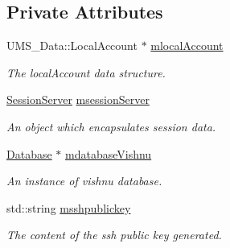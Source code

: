 \subsection*{Private Attributes}
\begin{DoxyCompactItemize}
\item 
\hypertarget{classLocalAccountServer_abe6fd379011deb69279d5a6b137b8511}{
UMS\_\-Data::LocalAccount $\ast$ \hyperlink{classLocalAccountServer_abe6fd379011deb69279d5a6b137b8511}{mlocalAccount}}
\label{classLocalAccountServer_abe6fd379011deb69279d5a6b137b8511}

\begin{DoxyCompactList}\small\item\em The localAccount data structure. \item\end{DoxyCompactList}\item 
\hypertarget{classLocalAccountServer_a3aa9508d0413c66af764f91a649dee61}{
\hyperlink{classSessionServer}{SessionServer} \hyperlink{classLocalAccountServer_a3aa9508d0413c66af764f91a649dee61}{msessionServer}}
\label{classLocalAccountServer_a3aa9508d0413c66af764f91a649dee61}

\begin{DoxyCompactList}\small\item\em An object which encapsulates session data. \item\end{DoxyCompactList}\item 
\hypertarget{classLocalAccountServer_ad46d4a698cf64186f517acf55caa9a51}{
\hyperlink{classDatabase}{Database} $\ast$ \hyperlink{classLocalAccountServer_ad46d4a698cf64186f517acf55caa9a51}{mdatabaseVishnu}}
\label{classLocalAccountServer_ad46d4a698cf64186f517acf55caa9a51}

\begin{DoxyCompactList}\small\item\em An instance of vishnu database. \item\end{DoxyCompactList}\item 
\hypertarget{classLocalAccountServer_a607ade4283d00544839df6713e90893b}{
std::string \hyperlink{classLocalAccountServer_a607ade4283d00544839df6713e90893b}{msshpublickey}}
\label{classLocalAccountServer_a607ade4283d00544839df6713e90893b}

\begin{DoxyCompactList}\small\item\em The content of the ssh public key generated. \item\end{DoxyCompactList}\end{DoxyCompactItemize}


